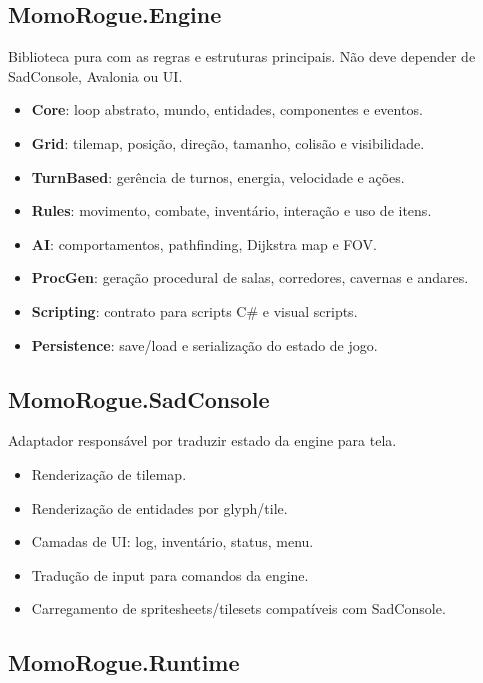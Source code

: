 \documentclass[12pt,a4paper]{article}
\begin{document}
\subsection{MomoRogue.Engine}

Biblioteca pura com as regras e estruturas principais. Não deve depender de SadConsole, Avalonia ou UI.

\begin{itemize}
    \item \textbf{Core}: loop abstrato, mundo, entidades, componentes e eventos.
    \item \textbf{Grid}: tilemap, posição, direção, tamanho, colisão e visibilidade.
    \item \textbf{TurnBased}: gerência de turnos, energia, velocidade e ações.
    \item \textbf{Rules}: movimento, combate, inventário, interação e uso de itens.
    \item \textbf{AI}: comportamentos, pathfinding, Dijkstra map e FOV.
    \item \textbf{ProcGen}: geração procedural de salas, corredores, cavernas e andares.
    \item \textbf{Scripting}: contrato para scripts C\# e visual scripts.
    \item \textbf{Persistence}: save/load e serialização do estado de jogo.
\end{itemize}

\subsection{MomoRogue.SadConsole}

Adaptador responsável por traduzir estado da engine para tela.

\begin{itemize}
    \item Renderização de tilemap.
    \item Renderização de entidades por glyph/tile.
    \item Camadas de UI: log, inventário, status, menu.
    \item Tradução de input para comandos da engine.
    \item Carregamento de spritesheets/tilesets compatíveis com SadConsole.
\end{itemize}

\subsection{MomoRogue.Runtime}
\end{document}
